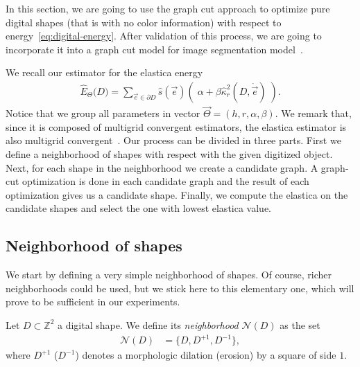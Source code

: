 \documentclass[review]{siamart220329}
\newcommand{\digset}{D} %
\begin{document}
In this section, we are going to use the graph cut approach
to optimize pure digital shapes (that is with no color information) with
respect to energy~\eqref{eq:digital-energy}. After validation of this
process, we are going to incorporate it into a graph cut model for 
image segmentation model~\cite{boykov01graphcut}. 

%
%
We recall our estimator for the elastica energy 
%
\begin{align}
    \hat{E}_{\Theta}\big( \digset \big) = \sum_{\vec{e} \in \partial \digset}{
    \hat{s}(\vec{e})\left(\; \alpha + \beta
    \hat{\kappa}_{r}^2(\digset,\dot{\vec{e}}) \; \right)}.
	\label{eq:elastica-estimator-2}
\end{align}
%
%
Notice that we group all parameters in vector $\vec{\Theta}=(h,r,\alpha,\beta)$.
We remark that, since it is composed of multigrid convergent estimators, the
elastica estimator is also multigrid convergent~\cite{lachaud06hdr}.
%
Our process can be divided in three parts. First we define a
neighborhood of shapes with respect with the given digitized object. Next, for
each shape in the neighborhood we create a candidate graph. A graph-cut
optimization is done in each candidate graph and the result of each
optimization gives us a candidate shape. Finally, we compute the elastica on
the candidate shapes and select the one with lowest elastica value. 
%    
%
%
%
\subsection{Neighborhood of shapes}
%
%
We start by defining a very simple neighborhood of shapes. Of course, richer
neighborhoods could be used, but we stick here to this elementary one, which
will prove to be sufficient in our experiments.
%
%
\begin{definition}
    Let $\digset \subset \mathbb{Z}^2$ a digital shape. We define its {\em
    neighborhood}  $\mathcal{N}(\digset)$ as the set
	\begin{align*}
		\mathcal{N}(\digset) &= \Big\{\digset, \digset^{+1},\digset^{-1} \big\},
	\end{align*}
    where $\digset^{+1}$ ($\digset^{-1}$) denotes a morphologic dilation (erosion) by a
    square of side $1$.
\end{definition}
%
%
\end{document}
